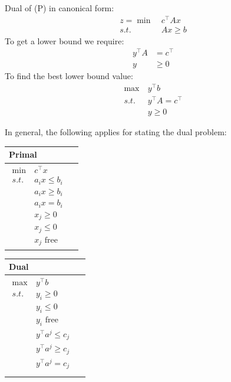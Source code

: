 \documentclass[11pt]{article}
\numberwithin{equation}{section}
\begin{document}
Dual of (P) in canonical form:
\begin{align*}
    z=\min& \ c^\top Ax\\
    s.t.& \ Ax \geq b
\end{align*}
To get a lower bound we require:
\begin{align*}
    y^\top A&=c^\top \\
    y &\geq 0
\end{align*}
To find the best lower bound value:
\begin{align*}
    \max& \ y^\top b\\
    s.t.& \ y^\top A = c^\top \\
    & \ y \geq 0
\end{align*}

In general, the following applies for stating the dual problem:
\begin{table}[H]
    \begin{minipage}[t]{.5\linewidth}
        \vspace{0pt}
        \centering
        \begin{tabular}{ll}
            Primal \\ \hline
            \parbox{5cm}{\begin{align*}
                \min \ & c^\top x \\
                s.t. \ & a_ix\leq b_i \\
                \ & a_ix\geq b_i \\
                \ & a_ix = b_i \\
                \ & x_j \geq 0 \\
                \ & x_j \leq 0 \\
                \ &x_j \text{ free}
            \end{align*}}
        \end{tabular}
    \end{minipage}%
    \begin{minipage}[t]{.5\linewidth}
        \vspace{0pt}
        \centering
        \begin{tabular}{ll}
            Dual \\ \hline
            \parbox{5cm}{\begin{align*}
                \max \ & y^\top b \\
                s.t. \ &y_i \geqslant 0 \\
                &y_i \leq 0 \\
                &y_i \text{ free} \\
                &y^\top a^j \leq c_j \\
                &y^\top a^j \geq c_j \\
                &y^\top a^j = c_j \\
            \end{align*}}
        \end{tabular}
    \end{minipage} 
\end{table}
\end{document}
